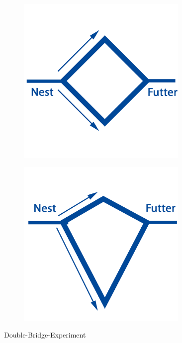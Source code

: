 \documentclass[doktyp=barbeit, sprache=german]{TUBAFarbeiten}
\begin{document}
\begin{figure}
\captionsetup[subfigure]{justification=centering}
\centering
\begin{subfigure}[c]{0.45\textwidth}
\includegraphics[width=0.9\textwidth]{images/RouteTrivial.png}
\end{subfigure}
\begin{subfigure}[c]{0.45\textwidth}
\includegraphics[width=0.9\textwidth]{images/RouteAdv.png}
\end{subfigure}
\caption{Double-Bridge-Experiment}
\label{img:DBExperiment}
\end{figure}
\end{document}
